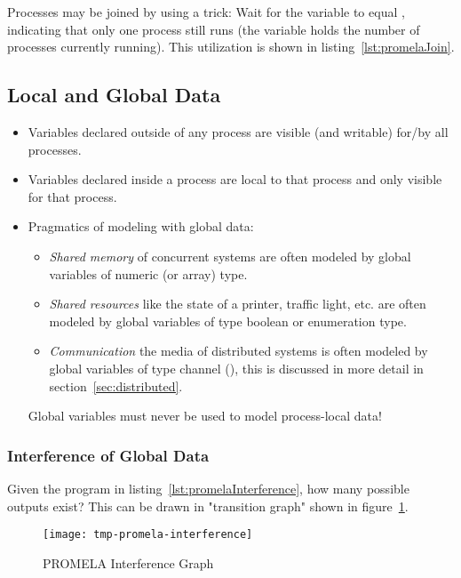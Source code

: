 			Processes may be joined by using a trick: Wait for the variable  to equal , indicating that only one process still runs (the variable holds the number of processes currently running). This utilization is shown in listing~\ref{lst:promelaJoin}.

		\subsection{Local and Global Data}
			\begin{itemize}
				\item Variables declared outside of any process are visible (and writable) for/by all processes.
				\item Variables declared inside a process are local to that process and only visible for that process.
				\item Pragmatics of modeling with global data:
					\begin{itemize}
						\item \textit{Shared memory} of concurrent systems are often modeled by global variables of numeric (or array) type.
						\item \textit{Shared resources} like the state of a printer, traffic light, etc. are often modeled by global variables of type boolean or enumeration type.
						\item \textit{Communication} the media of distributed systems is often modeled by global variables of type channel (), this is discussed in more detail in section~\ref{sec:distributed}.
					\end{itemize}
					Global variables must never be used to model process-local data!
			\end{itemize}
		
			\subsubsection{Interference of Global Data}
				
			
				Given the program in listing~\ref{lst:promelaInterference}, how many possible outputs exist? This can be drawn in "transition graph" shown in figure~\ref{fig:promelaInterference}.
				
				\begin{figure}
					\centering
					\texttt{[image: tmp-promela-interference]}
					\caption{PROMELA Interference Graph}
					\label{fig:promelaInterference}
				\end{figure}

